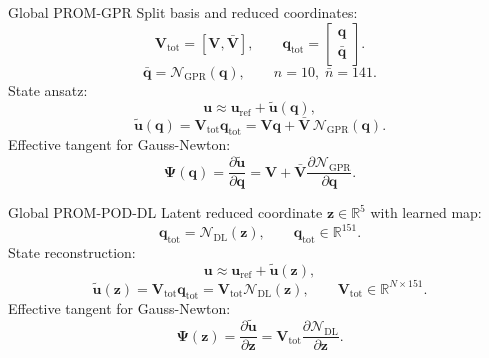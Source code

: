 \documentclass{beamer}
\begin{document}
\begin{frame}{Global PROM-GPR}
\small
Split basis and reduced coordinates:
\[
\mathbf{V}_{\mathrm{tot}}=[\mathbf{V},\bar{\mathbf{V}}],
\qquad
\mathbf{q}_{\mathrm{tot}}=
\begin{bmatrix}
\mathbf{q}\\
\bar{\mathbf{q}}
\end{bmatrix}.
\]
\[
\bar{\mathbf{q}}=\mathcal{N}_{\mathrm{GPR}}(\mathbf{q}),
\qquad
n=10,\;\bar{n}=141.
\]
State ansatz:
\[
\mathbf{u}\approx
\mathbf{u}_{\mathrm{ref}}
+\widetilde{\mathbf{u}}(\mathbf{q}),
\]
\[
\widetilde{\mathbf{u}}(\mathbf{q})
=\mathbf{V}_{\mathrm{tot}}\mathbf{q}_{\mathrm{tot}}
=\mathbf{V}\mathbf{q}
+\bar{\mathbf{V}}\,\mathcal{N}_{\mathrm{GPR}}(\mathbf{q}).
\]
Effective tangent for Gauss-Newton:
\[
\mathbf{\Psi}(\mathbf{q})
=\frac{\partial\widetilde{\mathbf{u}}}{\partial\mathbf{q}}
=\mathbf{V}
+\bar{\mathbf{V}}\frac{\partial\mathcal{N}_{\mathrm{GPR}}}{\partial\mathbf{q}}.
\]
\end{frame}

\begin{frame}{Global PROM-POD-DL}
\small
Latent reduced coordinate $\mathbf{z}\in\mathbb{R}^{5}$ with learned map:
\[
\mathbf{q}_{\mathrm{tot}}=\mathcal{N}_{\mathrm{DL}}(\mathbf{z}),
\qquad
\mathbf{q}_{\mathrm{tot}}\in\mathbb{R}^{151}.
\]
State reconstruction:
\[
\mathbf{u}\approx
\mathbf{u}_{\mathrm{ref}}
+\widetilde{\mathbf{u}}(\mathbf{z}),
\]
\[
\widetilde{\mathbf{u}}(\mathbf{z})
=\mathbf{V}_{\mathrm{tot}}\mathbf{q}_{\mathrm{tot}}
=\mathbf{V}_{\mathrm{tot}}\mathcal{N}_{\mathrm{DL}}(\mathbf{z}),
\qquad
\mathbf{V}_{\mathrm{tot}}\in\mathbb{R}^{N\times 151}.
\]
Effective tangent for Gauss-Newton:
\[
\mathbf{\Psi}(\mathbf{z})
=\frac{\partial\widetilde{\mathbf{u}}}{\partial\mathbf{z}}
=\mathbf{V}_{\mathrm{tot}}
\frac{\partial\mathcal{N}_{\mathrm{DL}}}{\partial\mathbf{z}}.
\]
\end{frame}
\end{document}
